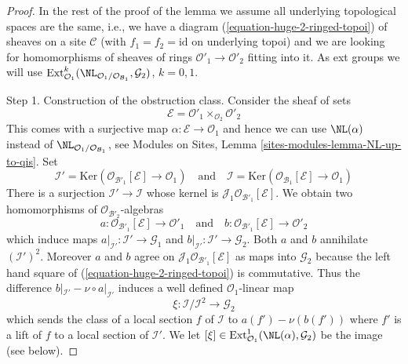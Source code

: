 \begin{proof}
\medskip\noindent
In the rest of the proof of the lemma we assume
all underlying topological spaces are the
same, i.e., we have a diagram (\ref{equation-huge-2-ringed-topoi})
of sheaves on a site $\mathcal{C}$ (with $f_1 = f_2 = \text{id}$
on underlying topoi) and we are looking for
homomorphisms of sheaves of rings
$\mathcal{O}'_1 \to \mathcal{O}'_2$ fitting into it.
As ext groups we will use
$\text{Ext}^k_{\mathcal{O}_1}(
\NL_{\mathcal{O}_1/\mathcal{O}_{\mathcal{B}_1}}, \mathcal{G}_2)$, $k = 0, 1$.

\medskip\noindent
Step 1. Construction of the obstruction class. Consider the sheaf
of sets
$$
\mathcal{E} = \mathcal{O}'_1 \times_{\mathcal{O}_2} \mathcal{O}'_2
$$
This comes with a surjective map $\alpha : \mathcal{E} \to \mathcal{O}_1$
and hence we can use $\NL(\alpha)$ instead of
$\NL_{\mathcal{O}_1/\mathcal{O}_{\mathcal{B}_1}}$, see
Modules on Sites, Lemma \ref{sites-modules-lemma-NL-up-to-qis}.
Set
$$
\mathcal{I}' =
\text{Ker}(\mathcal{O}_{\mathcal{B}'_1}[\mathcal{E}] \to \mathcal{O}_1)
\quad\text{and}\quad
\mathcal{I} =
\text{Ker}(\mathcal{O}_{\mathcal{B}_1}[\mathcal{E}] \to \mathcal{O}_1)
$$
There is a surjection $\mathcal{I}' \to \mathcal{I}$ whose kernel
is $\mathcal{J}_1\mathcal{O}_{\mathcal{B}'_1}[\mathcal{E}]$.
We obtain two homomorphisms of $\mathcal{O}_{\mathcal{B}'_2}$-algebras
$$
a : \mathcal{O}_{\mathcal{B}'_1}[\mathcal{E}] \to \mathcal{O}'_1
\quad\text{and}\quad
b : \mathcal{O}_{\mathcal{B}'_1}[\mathcal{E}] \to \mathcal{O}'_2
$$
which induce maps $a|_{\mathcal{I}'} : \mathcal{I}' \to \mathcal{G}_1$ and
$b|_{\mathcal{I}'} : \mathcal{I}' \to \mathcal{G}_2$. Both $a$ and $b$
annihilate $(\mathcal{I}')^2$. Moreover $a$ and $b$ agree on
$\mathcal{J}_1\mathcal{O}_{\mathcal{B}'_1}[\mathcal{E}]$
as maps into $\mathcal{G}_2$
because the left hand square of (\ref{equation-huge-2-ringed-topoi})
is commutative. Thus the difference
$b|_{\mathcal{I}'} - \nu \circ a|_{\mathcal{I}'}$
induces a well defined $\mathcal{O}_1$-linear map
$$
\xi : \mathcal{I}/\mathcal{I}^2 \longrightarrow \mathcal{G}_2
$$
which sends the class of a local section $f$ of $\mathcal{I}$ to
$a(f') - \nu(b(f'))$ where $f'$ is a lift of $f$ to a local
section of $\mathcal{I}'$. We let
$[\xi] \in \text{Ext}^1_{\mathcal{O}_1}(\NL(\alpha), \mathcal{G}_2)$
be the image (see below).


\end{proof}
